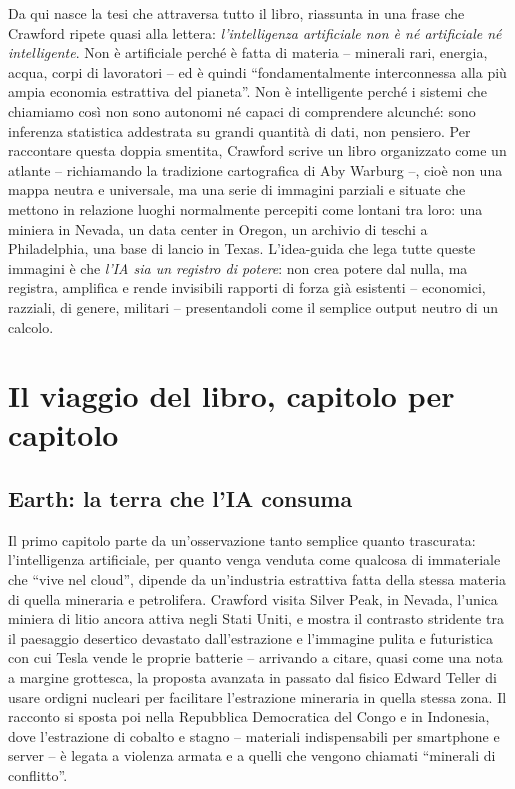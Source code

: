 \documentclass[a4paper,11pt]{article}
\begin{document}
Da qui nasce la tesi che attraversa tutto il libro, riassunta in una frase che Crawford ripete quasi alla lettera: \emph{l'intelligenza artificiale non è né artificiale né intelligente}. Non è artificiale perché è fatta di materia -- minerali rari, energia, acqua, corpi di lavoratori -- ed è quindi ``fondamentalmente interconnessa alla più ampia economia estrattiva del pianeta''. Non è intelligente perché i sistemi che chiamiamo così non sono autonomi né capaci di comprendere alcunché: sono inferenza statistica addestrata su grandi quantità di dati, non pensiero. Per raccontare questa doppia smentita, Crawford scrive un libro organizzato come un atlante -- richiamando la tradizione cartografica di Aby Warburg --, cioè non una mappa neutra e universale, ma una serie di immagini parziali e situate che mettono in relazione luoghi normalmente percepiti come lontani tra loro: una miniera in Nevada, un data center in Oregon, un archivio di teschi a Philadelphia, una base di lancio in Texas. L'idea-guida che lega tutte queste immagini è che \emph{l'IA sia un registro di potere}: non crea potere dal nulla, ma registra, amplifica e rende invisibili rapporti di forza già esistenti -- economici, razziali, di genere, militari -- presentandoli come il semplice output neutro di un calcolo.

\section{Il viaggio del libro, capitolo per capitolo}

\subsection{Earth: la terra che l'IA consuma}

Il primo capitolo parte da un'osservazione tanto semplice quanto trascurata: l'intelligenza artificiale, per quanto venga venduta come qualcosa di immateriale che ``vive nel cloud'', dipende da un'industria estrattiva fatta della stessa materia di quella mineraria e petrolifera. Crawford visita Silver Peak, in Nevada, l'unica miniera di litio ancora attiva negli Stati Uniti, e mostra il contrasto stridente tra il paesaggio desertico devastato dall'estrazione e l'immagine pulita e futuristica con cui Tesla vende le proprie batterie -- arrivando a citare, quasi come una nota a margine grottesca, la proposta avanzata in passato dal fisico Edward Teller di usare ordigni nucleari per facilitare l'estrazione mineraria in quella stessa zona. Il racconto si sposta poi nella Repubblica Democratica del Congo e in Indonesia, dove l'estrazione di cobalto e stagno -- materiali indispensabili per smartphone e server -- è legata a violenza armata e a quelli che vengono chiamati ``minerali di conflitto''.
\end{document}
